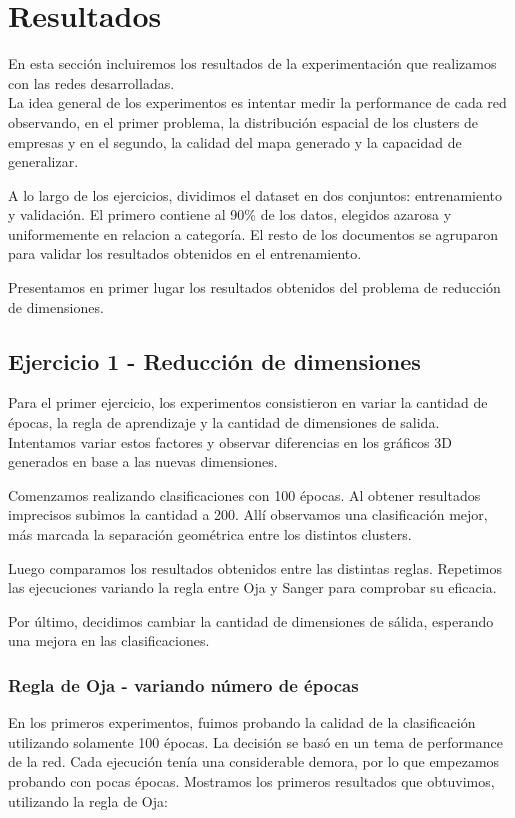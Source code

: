 \section{Resultados}
En esta sección incluiremos los resultados de la experimentación que realizamos con las redes desarrolladas.\\

La idea general de los experimentos es intentar medir la performance
de cada red observando, en el primer problema, la distribución espacial de los clusters de empresas y en el segundo, la calidad 
del mapa generado y la capacidad de generalizar.

A lo largo de los ejercicios, dividimos el dataset en dos conjuntos: entrenamiento y validación. El primero contiene al 90\% de los datos, elegidos
azarosa y uniformemente en relacion a categoría. El resto de los documentos se agruparon para validar los resultados obtenidos en el entrenamiento.

Presentamos en primer lugar los resultados obtenidos del problema de reducción de dimensiones.

\subsection{Ejercicio 1 - Reducción de dimensiones}

Para el primer ejercicio, los experimentos consistieron en variar la cantidad de épocas, la regla de aprendizaje y la cantidad de dimensiones de salida. Intentamos variar estos factores y observar diferencias en los gráficos 3D generados en base a las nuevas dimensiones.

Comenzamos realizando clasificaciones con 100 épocas. Al obtener resultados imprecisos subimos la cantidad a 200. Allí observamos una clasificación mejor, más marcada la separación geométrica entre los distintos clusters.

Luego comparamos los resultados obtenidos entre las distintas reglas. Repetimos las ejecuciones variando la regla entre Oja y Sanger para comprobar su eficacia.

Por último, decidimos cambiar la cantidad de dimensiones de sálida, esperando una mejora en las clasificaciones. 

\subsubsection{Regla de Oja - variando número de épocas}
En los primeros experimentos, fuimos probando la calidad de la clasificación utilizando solamente 100 épocas. La decisión se basó en un tema de performance de la red. Cada ejecución tenía una considerable demora, por lo que empezamos probando con pocas épocas. Mostramos los primeros resultados que obtuvimos, utilizando la regla de Oja:

